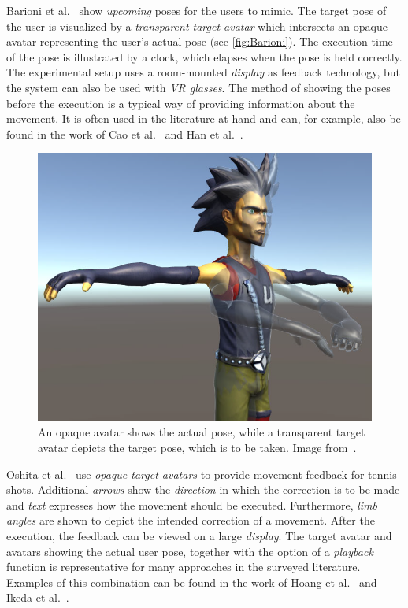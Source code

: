 Barioni et al.~\cite{barioni2019bvr} show \emph{upcoming} poses for the users to mimic. The target pose of the user is visualized by a \emph{transparent target avatar} which intersects an opaque avatar representing the user's actual pose (see \autoref{fig:Barioni}). The execution time of the pose is illustrated by a clock, which elapses when the pose is held correctly. The experimental setup uses a room-mounted \emph{display} as feedback technology, but the system can also be used with \emph{VR glasses}. The method of showing the poses before the execution is a typical way of providing information about the movement. It is often used in the literature at hand and can, for example, also be found in the work of Cao et al.~\cite{cao2020esa} and Han et al.~\cite{han2016ara}.
\begin{figure}[ht]
    \includegraphics[width=\linewidth]{pictures/Barioni.png}
    \caption{An opaque avatar shows the actual pose, while a transparent target avatar depicts the target pose, which is to be taken. Image from~\cite{barioni2019bvr}.\label{fig:Barioni}}
\end{figure}

Oshita et al.~\cite{oshita2018sts} use \emph{opaque target avatars} to provide movement feedback for tennis shots. Additional \emph{arrows} show the \emph{direction} in which the correction is to be made and \emph{text} expresses how the movement should be executed. Furthermore, \emph{limb angles} are shown to depict the intended correction of a movement. After the execution, the feedback can be viewed on a large \emph{display}. The target avatar and avatars showing the actual user pose, together with the option of a \emph{playback} function is representative for many approaches in the surveyed literature. Examples of this combination can be found in the work of Hoang et al.~\cite{hoang2016orp} and Ikeda et al.~\cite{ikeda2018arb}. 

